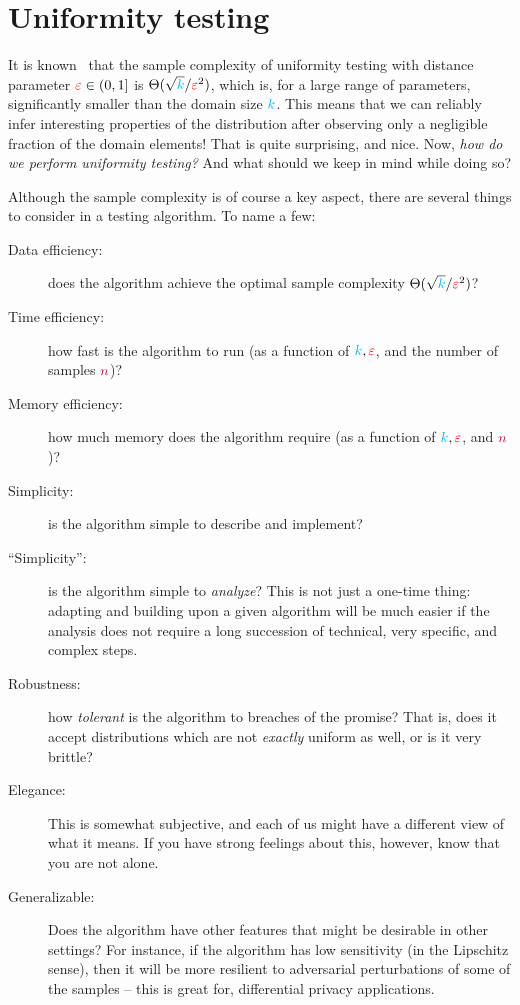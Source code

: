 \section{Uniformity testing}
  \label{sec:uniformity}

It is known~\citep{Paninski08} that the sample complexity of uniformity testing with distance parameter $\textcolor{red}{\varepsilon}\in(0,1]$ is $\Theta(\sqrt{{\textcolor{cyan}{k}}}/\textcolor{red}{\varepsilon}^2)$, which is, for a large range of parameters, significantly smaller than the domain size ${\textcolor{cyan}{k}}$. This means that we can reliably infer interesting properties of the distribution after observing only a negligible fraction of the domain elements! That is quite surprising, and nice. Now, \emph{how do we perform uniformity testing?}  And what should we keep in mind while doing so?


Although the sample complexity is of course a key aspect, there are several things to consider in a testing algorithm. To name a few:
\begin{description}
  \item[Data efficiency:] does the algorithm achieve the optimal sample complexity $\Theta(\sqrt{{\textcolor{cyan}{k}}}/\textcolor{red}{\varepsilon}^2)$?
  \item[Time efficiency:] how fast is the algorithm to run (as a function of ${\textcolor{cyan}{k}},\textcolor{red}{\varepsilon}$, and the number of samples ${\textcolor{purple}{n}}$)?
  \item[Memory efficiency:] how much memory does the algorithm require (as a function of ${\textcolor{cyan}{k}},\textcolor{red}{\varepsilon}$, and ${\textcolor{purple}{n}}$)?
  \item[Simplicity:] is the algorithm simple to describe and implement?
  \item[``Simplicity'':] is the algorithm simple to \emph{analyze}? This is not just a one-time thing: adapting and building upon a given algorithm will be much easier if the analysis does not require a long succession of technical, very specific, and complex steps.
  \item[Robustness:] how \emph{tolerant} is the algorithm to breaches of the promise? That is, does it accept distributions which are not \emph{exactly} uniform as well, or is it very brittle?
  \item[Elegance:] This is somewhat subjective, and each of us might have a different view of what it means. If you have strong feelings about this, however, know that you are not alone.
  \item[Generalizable:] Does the algorithm have other features that might be desirable in other settings? For instance, if the algorithm has low sensitivity (in the Lipschitz sense), then it will be more resilient to adversarial perturbations of some of the samples -- this is great for, \eg differential privacy applications. 
\end{description}

